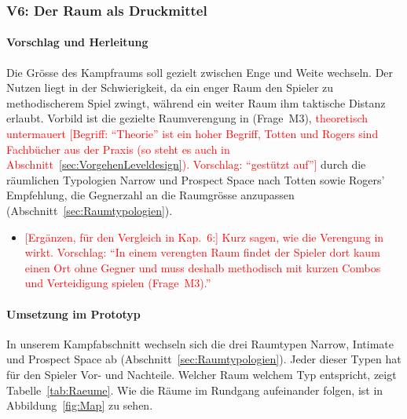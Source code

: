 \documentclass[../Main.tex]{subfiles}
\begin{document}
\subsubsection{V6: Der Raum als Druckmittel} \label{sec:V6}

\paragraph{Vorschlag und Herleitung}
Die Grösse des Kampfraums soll gezielt zwischen Enge und Weite wechseln. Der Nutzen liegt in der Schwierigkeit, da ein enger Raum den Spieler zu methodischerem Spiel zwingt, während ein weiter Raum ihm taktische Distanz erlaubt. Vorbild ist die gezielte Raumverengung in  (Frage~M3), \textcolor{red}{theoretisch untermauert [Begriff: \enquote{Theorie} ist ein hoher Begriff, Totten und Rogers sind Fachbücher aus der Praxis (so steht es auch in Abschnitt~\ref{sec:VorgehenLeveldesign}). Vorschlag: \enquote{gestützt auf}]} durch die räumlichen Typologien Narrow und Prospect Space nach Totten sowie Rogers' Empfehlung, die Gegnerzahl an die Raumgrösse anzupassen (Abschnitt~\ref{sec:Raumtypologien}).

\begin{itemize}[leftmargin=1.5cm]
    \item \textcolor{red}{[Ergänzen, für den Vergleich in Kap.~6:] Kurz sagen, wie die Verengung in  wirkt. Vorschlag: \enquote{In einem verengten Raum findet der Spieler dort kaum einen Ort ohne Gegner und muss deshalb methodisch mit kurzen Combos und Verteidigung spielen (Frage~M3).}}
\end{itemize}

\paragraph{Umsetzung im Prototyp}
In unserem Kampfabschnitt wechseln sich die drei Raumtypen Narrow, Intimate und Prospect Space ab (Abschnitt~\ref{sec:Raumtypologien}). Jeder dieser Typen hat für den Spieler Vor- und Nachteile. Welcher Raum welchem Typ entspricht, zeigt Tabelle~\ref{tab:Raeume}. Wie die Räume im Rundgang aufeinander folgen, ist in Abbildung~\ref{fig:Map} zu sehen.
\end{document}
